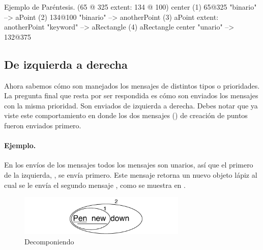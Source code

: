 \documentclass[a4paper,10pt,twoside]{book}
\begin{document}
\begin{example}[decExtent]{Ejemplo de Paréntesis.}{}
      (65 @ 325 extent: 134 @ 100) center
(1)   65@325                                  "binario"
      --> aPoint
(2)   134@100                                 "binario"
      --> anotherPoint
(3)   aPoint extent: anotherPoint      "keyword"
      --> aRectangle
(4)   aRectangle center                    "unario"
      --> 132@375
\end{example}

\subsection{De izquierda a derecha}
Ahora sabemos cómo son manejados los mensajes de distintos tipos o prioridades. La pregunta final que resta por ser respondida es cómo son enviados los mensajes con la misma prioridad. Son enviados de izquierda a derecha. Debes notar que ya viste este comportamiento en   donde los dos mensajes () de creación de puntos fueron enviados primero.



\paragraph{Ejemplo.} En los envíos de los mensajes  todos los mensajes son unarios, así que el primero de la izquierda, , se envía primero. Este mensaje retorna un nuevo objeto lápiz al cual se le envía el segundo mensaje , como se muestra en .

\begin{figure}
	\centering
	\includegraphics[width=8cm]{ucompoUn}
	\caption{Decomponiendo }
\end{figure}
\end{document}
